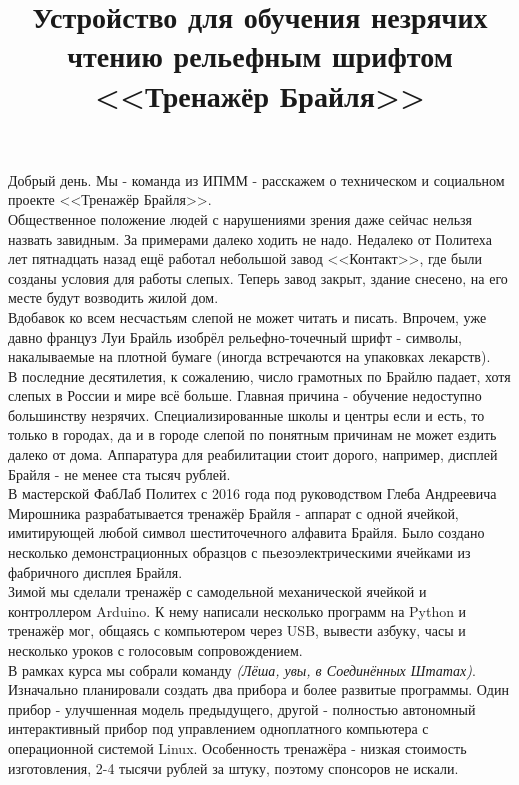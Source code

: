 \documentclass[a4paper,12pt]{article} %
\begin{document}
\title{Устройство для обучения незрячих чтению рельефным шрифтом <<Тренажёр Брайля>>}
\maketitle
Добрый день. Мы - команда из ИПММ - расскажем о техническом и социальном проекте <<Тренажёр Брайля>>.\\ %
Общественное положение людей с нарушениями зрения даже сейчас нельзя назвать завидным. За примерами далеко ходить не надо. Недалеко от Политеха лет пятнадцать назад ещё работал небольшой завод <<Контакт>>, где были созданы условия для работы слепых. Теперь завод закрыт, здание снесено, на его месте будут возводить жилой дом.\\ %
Вдобавок ко всем несчастьям слепой не может читать и писать. Впрочем, уже давно француз Луи Брайль изобрёл рельефно-точечный шрифт - символы, накалываемые на плотной бумаге (иногда встречаются на упаковках лекарств).\\ %
В последние десятилетия, к сожалению, число грамотных по Брайлю падает, хотя слепых в России и мире всё больше. Главная причина - обучение недоступно большинству незрячих. Специализированные школы и центры если и есть, то только в городах, да и в городе слепой по понятным причинам не может ездить далеко от дома. Аппаратура для реабилитации стоит дорого, например, дисплей Брайля - не менее ста тысяч рублей.\\ %
В мастерской ФабЛаб Политех с 2016 года под руководством Глеба Андреевича Мирошника разрабатывается тренажёр Брайля - аппарат с одной ячейкой, имитирующей любой символ шеститочечного алфавита Брайля. Было создано несколько демонстрационных образцов с пьезоэлектрическими ячейками из фабричного дисплея Брайля.\\ %
Зимой мы сделали тренажёр с самодельной механической ячейкой и контроллером Arduino. К нему написали несколько программ на Python и тренажёр мог, общаясь с компьютером через USB, вывести азбуку, часы и несколько уроков с голосовым сопровождением. \\ %
В рамках курса мы собрали команду \textit{(Лёша, увы, в Соединённых Штатах)}. Изначально планировали создать два прибора и более развитые программы. Один прибор - улучшенная модель предыдущего, другой - полностью автономный интерактивный прибор под управлением одноплатного компьютера с операционной системой Linux. Особенность тренажёра - низкая стоимость изготовления, 2-4 тысячи рублей за штуку, поэтому спонсоров не искали.\\ %
\end{document}
